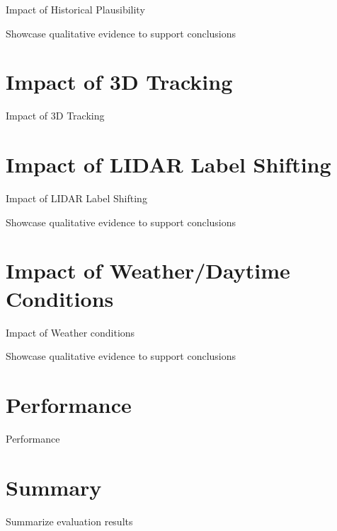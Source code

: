 Impact of Historical Plausibility

\newpage

Showcase qualitative evidence to support conclusions

\newpage


\section{Impact of 3D Tracking}
\label{sec:impacttracking}

Impact of 3D Tracking

\newpage


\section{Impact of LIDAR Label Shifting}
\label{sec:impactlabelshifting}

Impact of LIDAR Label Shifting

\newpage

Showcase qualitative evidence to support conclusions

\newpage


\section{Impact of Weather/Daytime Conditions}
\label{sec:weather}

Impact of Weather conditions

\newpage

Showcase qualitative evidence to support conclusions

\newpage


\section{Performance}
\label{sec:performance}

Performance

\newpage


\section{Summary}
\label{sec:summary}

Summarize evaluation results

